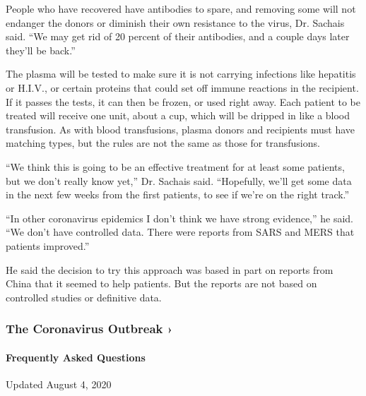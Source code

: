 People who have recovered have antibodies to spare, and removing some
will not endanger the donors or diminish their own resistance to the
virus, Dr. Sachais said. ``We may get rid of 20 percent of their
antibodies, and a couple days later they'll be back.''

The plasma will be tested to make sure it is not carrying infections
like hepatitis or H.I.V., or certain proteins that could set off immune
reactions in the recipient. If it passes the tests, it can then be
frozen, or used right away. Each patient to be treated will receive one
unit, about a cup, which will be dripped in like a blood transfusion. As
with blood transfusions, plasma donors and recipients must have matching
types, but the rules are not the same as those for transfusions.

``We think this is going to be an effective treatment for at least some
patients, but we don't really know yet,'' Dr. Sachais said. ``Hopefully,
we'll get some data in the next few weeks from the first patients, to
see if we're on the right track.''

``In other coronavirus epidemics I don't think we have strong
evidence,'' he said. ``We don't have controlled data. There were reports
from SARS and MERS that patients improved.''

He said the decision to try this approach was based in part on reports
from China that it seemed to help patients. But the reports are not
based on controlled studies or definitive data.

\href{https://www.nytimes3xbfgragh.onion/news-event/coronavirus?action=click\&pgtype=Article\&state=default\&region=MAIN_CONTENT_3\&context=storylines_faq}{}

\hypertarget{the-coronavirus-outbreak-}{%
\subsubsection{The Coronavirus Outbreak
›}\label{the-coronavirus-outbreak-}}

\hypertarget{frequently-asked-questions}{%
\paragraph{Frequently Asked
Questions}\label{frequently-asked-questions}}

Updated August 4, 2020

